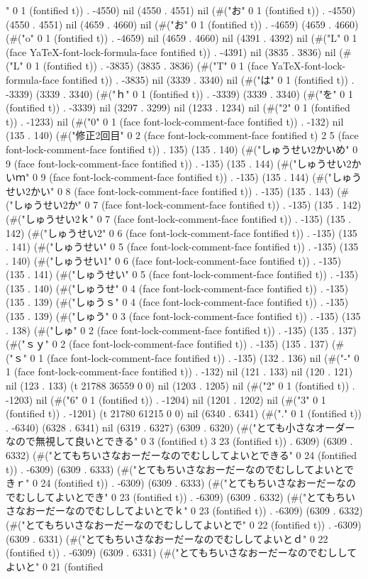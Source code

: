 " 0 1 (fontified t)) . -4550) nil (4550 . 4551) nil (#("お" 0 1 (fontified t)) . -4550) (4550 . 4551) nil (4659 . 4660) nil (#("お" 0 1 (fontified t)) . -4659) (4659 . 4660) (#("o" 0 1 (fontified t)) . -4659) nil (4659 . 4660) nil (4391 . 4392) nil (#("L" 0 1 (face YaTeX-font-lock-formula-face fontified t)) . -4391) nil (3835 . 3836) nil (#("L" 0 1 (fontified t)) . -3835) (3835 . 3836) (#("T" 0 1 (face YaTeX-font-lock-formula-face fontified t)) . -3835) nil (3339 . 3340) nil (#("は" 0 1 (fontified t)) . -3339) (3339 . 3340) (#("ｈ" 0 1 (fontified t)) . -3339) (3339 . 3340) (#("を" 0 1 (fontified t)) . -3339) nil (3297 . 3299) nil (1233 . 1234) nil (#("2" 0 1 (fontified t)) . -1233) nil (#("0" 0 1 (face font-lock-comment-face fontified t)) . -132) nil (135 . 140) (#("修正2回目" 0 2 (face font-lock-comment-face fontified t) 2 5 (face font-lock-comment-face fontified t)) . 135) (135 . 140) (#("しゅうせい2かいめ" 0 9 (face font-lock-comment-face fontified t)) . -135) (135 . 144) (#("しゅうせい2かいｍ" 0 9 (face font-lock-comment-face fontified t)) . -135) (135 . 144) (#("しゅうせい2かい" 0 8 (face font-lock-comment-face fontified t)) . -135) (135 . 143) (#("しゅうせい2か" 0 7 (face font-lock-comment-face fontified t)) . -135) (135 . 142) (#("しゅうせい2ｋ" 0 7 (face font-lock-comment-face fontified t)) . -135) (135 . 142) (#("しゅうせい2" 0 6 (face font-lock-comment-face fontified t)) . -135) (135 . 141) (#("しゅうせい" 0 5 (face font-lock-comment-face fontified t)) . -135) (135 . 140) (#("しゅうせい1" 0 6 (face font-lock-comment-face fontified t)) . -135) (135 . 141) (#("しゅうせい" 0 5 (face font-lock-comment-face fontified t)) . -135) (135 . 140) (#("しゅうせ" 0 4 (face font-lock-comment-face fontified t)) . -135) (135 . 139) (#("しゅうｓ" 0 4 (face font-lock-comment-face fontified t)) . -135) (135 . 139) (#("しゅう" 0 3 (face font-lock-comment-face fontified t)) . -135) (135 . 138) (#("しゅ" 0 2 (face font-lock-comment-face fontified t)) . -135) (135 . 137) (#("ｓｙ" 0 2 (face font-lock-comment-face fontified t)) . -135) (135 . 137) (#("ｓ" 0 1 (face font-lock-comment-face fontified t)) . -135) (132 . 136) nil (#("-" 0 1 (face font-lock-comment-face fontified t)) . -132) nil (121 . 133) nil (120 . 121) nil (123 . 133) (t 21788 36559 0 0) nil (1203 . 1205) nil (#("2" 0 1 (fontified t)) . -1203) nil (#("6" 0 1 (fontified t)) . -1204) nil (1201 . 1202) nil (#("3" 0 1 (fontified t)) . -1201) (t 21780 61215 0 0) nil (6340 . 6341) (#("." 0 1 (fontified t)) . -6340) (6328 . 6341) nil (6319 . 6327) (6309 . 6320) (#("とても小さなオーダーなので無視して良いとできる" 0 3 (fontified t) 3 23 (fontified t)) . 6309) (6309 . 6332) (#("とてもちいさなおーだーなのでむししてよいとできる" 0 24 (fontified t)) . -6309) (6309 . 6333) (#("とてもちいさなおーだーなのでむししてよいとできｒ" 0 24 (fontified t)) . -6309) (6309 . 6333) (#("とてもちいさなおーだーなのでむししてよいとでき" 0 23 (fontified t)) . -6309) (6309 . 6332) (#("とてもちいさなおーだーなのでむししてよいとでｋ" 0 23 (fontified t)) . -6309) (6309 . 6332) (#("とてもちいさなおーだーなのでむししてよいとで" 0 22 (fontified t)) . -6309) (6309 . 6331) (#("とてもちいさなおーだーなのでむししてよいとｄ" 0 22 (fontified t)) . -6309) (6309 . 6331) (#("とてもちいさなおーだーなのでむししてよいと" 0 21 (fontified 